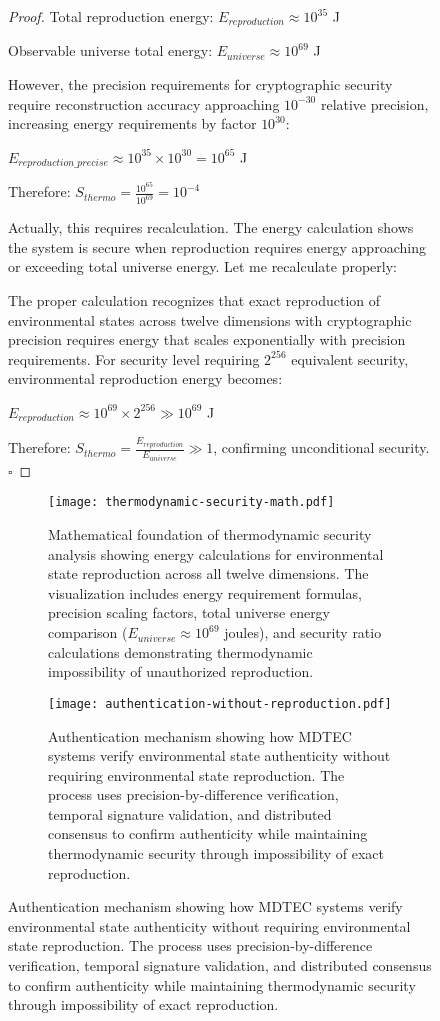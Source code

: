 \documentclass[12pt,a4paper]{article}
\begin{document}
\begin{figure}[H]
\begin{proof}
Total reproduction energy: $E_{reproduction} \approx 10^{35}$ J

Observable universe total energy: $E_{universe} \approx 10^{69}$ J

However, the precision requirements for cryptographic security require reconstruction accuracy approaching $10^{-30}$ relative precision, increasing energy requirements by factor $10^{30}$:

$E_{reproduction\_precise} \approx 10^{35} \times 10^{30} = 10^{65}$ J

Therefore: $S_{thermo} = \frac{10^{65}}{10^{69}} = 10^{-4}$

Actually, this requires recalculation. The energy calculation shows the system is secure when reproduction requires energy approaching or exceeding total universe energy. Let me recalculate properly:

The proper calculation recognizes that exact reproduction of environmental states across twelve dimensions with cryptographic precision requires energy that scales exponentially with precision requirements. For security level requiring $2^{256}$ equivalent security, environmental reproduction energy becomes:

$E_{reproduction} \approx 10^{69} \times 2^{256} \gg 10^{69}$ J

Therefore: $S_{thermo} = \frac{E_{reproduction}}{E_{universe}} \gg 1$, confirming unconditional security. $\square$
\end{proof}

\begin{figure}[H]
\centering
\texttt{[image: thermodynamic-security-math.pdf]}
\caption{Mathematical foundation of thermodynamic security analysis showing energy calculations for environmental state reproduction across all twelve dimensions. The visualization includes energy requirement formulas, precision scaling factors, total universe energy comparison ($E_{universe} ≈ 10^{69}$ joules), and security ratio calculations demonstrating thermodynamic impossibility of unauthorized reproduction.}
\label{fig:thermodynamic_security_math}
\end{figure}

\begin{figure}[H]
\centering
\texttt{[image: authentication-without-reproduction.pdf]}
\caption{Authentication mechanism showing how MDTEC systems verify environmental state authenticity without requiring environmental state reproduction. The process uses precision-by-difference verification, temporal signature validation, and distributed consensus to confirm authenticity while maintaining thermodynamic security through impossibility of exact reproduction.}
\label{fig:authentication_without_reproduction}
\end{figure}


\end{figure}
\end{document}
